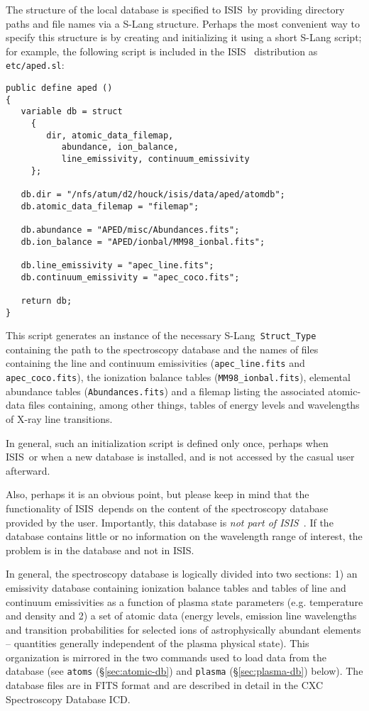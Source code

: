 \documentclass{book}
\newcommand{\isisx}{{\sc ISIS~}}
\newcommand{\isis}{{\sc ISIS}}
\newcommand{\slang}{{\sc S-Lang}}
\begin{document}
The structure of the local database is specified to \isisx by
providing directory paths and file names via a S-Lang structure.
Perhaps the most convenient way to specify this structure is by
creating and initializing it using a short S-Lang script; for
example, the following script is included in the \isisx
distribution as \verb|etc/aped.sl|:
\begin{verbatim}
public define aped ()
{
   variable db = struct
     {
        dir, atomic_data_filemap,
           abundance, ion_balance,
           line_emissivity, continuum_emissivity
     };

   db.dir = "/nfs/atum/d2/houck/isis/data/aped/atomdb";
   db.atomic_data_filemap = "filemap";

   db.abundance = "APED/misc/Abundances.fits";
   db.ion_balance = "APED/ionbal/MM98_ionbal.fits";

   db.line_emissivity = "apec_line.fits";
   db.continuum_emissivity = "apec_coco.fits";

   return db;
}
\end{verbatim}
This script generates an instance of the necessary \slang {\tt
Struct\_Type} containing the path to the spectroscopy database and
the names of files containing the line and continuum emissivities
({\tt apec\_line.fits} and {\tt apec\_coco.fits}), the
ionization balance tables ({\tt MM98\_ionbal.fits}), elemental
abundance tables ({\tt Abundances.fits}) and a filemap listing the
associated atomic-data files containing, among other things,
tables of energy levels and wavelengths of X-ray line transitions.

In general, such an initialization script is defined only once,
perhaps when \isisx or when a new database is
installed, and is not accessed by the casual user afterward.

Also, perhaps it is an obvious point, but please keep in mind that the
functionality of \isisx depends on the content of the spectroscopy database
provided by the user.  Importantly, this database is {\it not part of
\isisx}. If the database contains little or no information on the wavelength
range of interest, the problem is in the database and not in \isis.

In general, the spectroscopy database is logically divided into two
sections: 1) an emissivity database containing ionization balance tables and
tables of line and continuum emissivities as a function of plasma state
parameters (e.g. temperature and density and 2) a set of atomic data (energy
levels, emission line wavelengths and transition probabilities for selected
ions of astrophysically abundant elements -- quantities generally
independent of the plasma physical state).  This organization is mirrored in
the two commands used to load data from the database (see {\tt atoms}
(\S\ref{sec:atomic-db}) and {\tt plasma} (\S \ref{sec:plasma-db}) below).
The database files are in FITS format and are described in detail in the CXC
Spectroscopy Database ICD.
\end{document}
